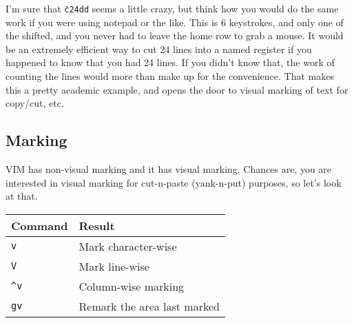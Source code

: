 \documentclass[a4paper, 12pt]{article}
\begin{document}
I'm sure that \texttt{\"{}c24dd} seems a little crazy, but think how you would do the same work if you were using notepad or the like. This is 6 keystrokes, and only one of the shifted, and you never had to leave the home row to grab a mouse. It would be an extremely efficient way to cut 24 lines into a named register if you happened to know that you had 24 lines. If you didn't know that, the work of counting the lines would more than make up for the convenience. That makes this a pretty academic example, and opens the door to visual marking of text for copy/cut, etc.
\subsection{Marking}
\label{"Marking"}
VIM has non-visual marking and it has visual marking. Chances are, you are interested in visual marking for cut-n-paste (yank-n-put) purposes, so let's look at that.

\begin{tabular}{ l | p{8cm} }
  \textbf{Command} & \textbf{Result}\\ \hline
  \texttt{v} & Mark character-wise\\ 
  \texttt{V} & Mark line-wise\\
  \texttt{\^{}v} & Column-wise marking\\
  \texttt{gv} & Remark the area last marked\\ \hline
\end{tabular}\\
\end{document}

